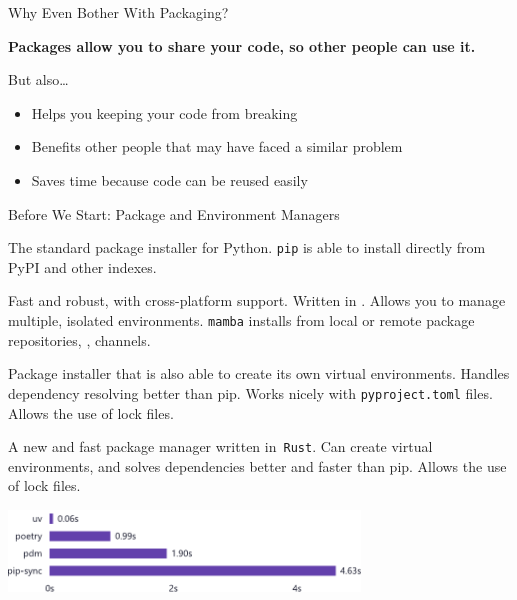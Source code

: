 \begin{frame}{Why Even Bother With Packaging?}
  \begin{center}
    \huge\textcolor{ccyan!90!cblack}{\textbf{Packages allow you to share your code, so other people can use it.}}
  \end{center}
  \vspace{2em}
  \textcolor{cpink}{But also\dots}
  \begin{itemize}
    \setlength{\itemsep}{1em}
    \item Helps you keeping your code from breaking
    \item Benefits other people that may have faced a similar problem
    \item Saves time because code can be reused easily
  \end{itemize}
\end{frame}

\begin{frame}{Before We Start: Package and Environment Managers}
  \begin{description}
    \setlength{\itemsep}{1em}
    \item [\iref{https://pypi.org/project/pip/}{pip}] The standard package installer for Python. \texttt{pip} is able to install
      directly from PyPI and other indexes.
    \item [\iref{https://mamba.readthedocs.io/en/latest/}{mamba}] Fast and robust, with cross-platform support. Written in \cpp.
      Allows you to manage multiple, isolated environments. \texttt{mamba} installs from local or remote package repositories, \eg, channels.
    \item [\iref{https://python-poetry.org/}{poetry}] Package installer that is also able to create its own virtual environments.
      Handles dependency resolving better than pip. Works nicely with \texttt{pyproject.toml} files. Allows the use of lock files.
    \item [\iref{https://docs.astral.sh/uv/}{uv}] A new and fast package manager written in {\footnotesize{\faRust}}\,\texttt{Rust}. Can create
      virtual environments, and solves dependencies better and faster than pip. Allows the use of lock files.
  \end{description}
  \begin{center}
    \includegraphics[width=0.7\textwidth]{graphics/speed.pdf}
  \end{center}
\end{frame}


